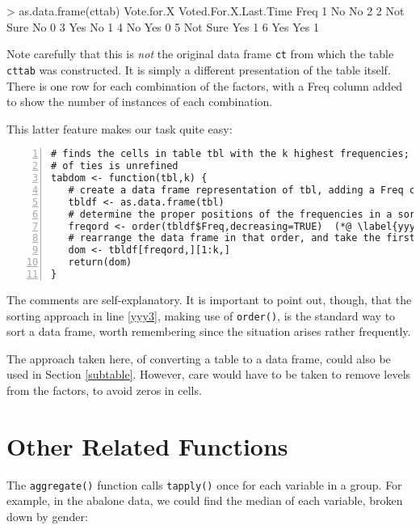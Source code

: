 \begin{Code}
> as.data.frame(cttab)
  Vote.for.X Voted.For.X.Last.Time Freq
1         No                    No    2
2   Not Sure                    No    0
3        Yes                    No    1
4         No                   Yes    0
5   Not Sure                   Yes    1
6        Yes                   Yes    1
\end{Code}

\noindent
Note carefully that this is {\it not} the original data frame {\tt ct}
from which the table {\tt cttab} was constructed.  It is simply a
different presentation of the table itself.  There is one row for each
combination of the factors, with a Freq column added to show the number
of instances of each combination.  

This latter feature makes our task quite easy:

\begin{lstlisting}[numbers=left]
# finds the cells in table tbl with the k highest frequencies; handling
# of ties is unrefined
tabdom <- function(tbl,k) {
   # create a data frame representation of tbl, adding a Freq column
   tbldf <- as.data.frame(tbl)
   # determine the proper positions of the frequencies in a sorted order
   freqord <- order(tbldf$Freq,decreasing=TRUE)  (*@ \label{yyy3} @*)
   # rearrange the data frame in that order, and take the first k rows
   dom <- tbldf[freqord,][1:k,]
   return(dom)
}
\end{lstlisting}

\noindent
The comments are self-explanatory.  It is important to point out,
though, that the sorting approach in line \ref{yyy3}, making use of 
{\tt order()}, is the standard way to sort a data frame, worth 
remembering since the situation arises rather frequently.

The approach taken here, of converting a table to a data frame, could also 
be used in Section \ref{subtable}.  However, care would have to be taken
to remove levels from the factors, to avoid zeros in cells.

\section{Other Related Functions}

The {\tt aggregate()} function calls {\tt tapply()} once for each
variable in a group.  For example, in the abalone data, we could find
the median of each variable, broken down by gender:


